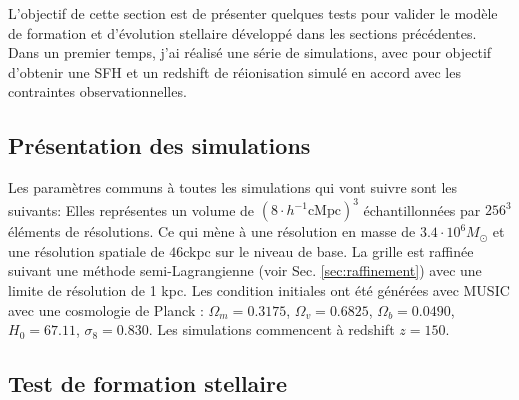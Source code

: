 L'objectif de cette section est de présenter quelques tests pour valider le modèle de formation et d'évolution stellaire développé dans les sections précédentes.
Dans un premier temps, j'ai réalisé une série de simulations, avec pour objectif d'obtenir une \ac{SFH} et un redshift de réionisation simulé en accord avec les contraintes observationnelles.

\subsection{Présentation des simulations}
\label{sec:pres_simu}

Les paramètres communs à toutes les simulations qui vont suivre sont les suivants:
Elles représentes un volume de $\left( 8\cdot h^{-1} \mathrm{cMpc} \right)^3$ échantillonnées par $256^3$ éléments de résolutions. %
Ce qui mène à une résolution en masse de $3.4 \cdot 10^6 M_\odot$ et une résolution spatiale de $46$ckpc sur le niveau de base.
La grille est raffinée suivant une méthode semi-Lagrangienne (voir Sec. \ref{sec:raffinement}) avec une limite de résolution de 1 kpc.
Les condition initiales ont été générées avec MUSIC \citep{hahn_multi-scale_2011} avec une cosmologie de Planck \citep{planck_collaboration_planck_2016} : 
$\Omega_m=0.3175$, 
$\Omega_v=0.6825$,
$\Omega_b=0.0490$,
$H_0=67.11$,
$\sigma_8=0.830$. 
Les simulations commencent à redshift $z=150$.


\subsection{Test de formation stellaire}

